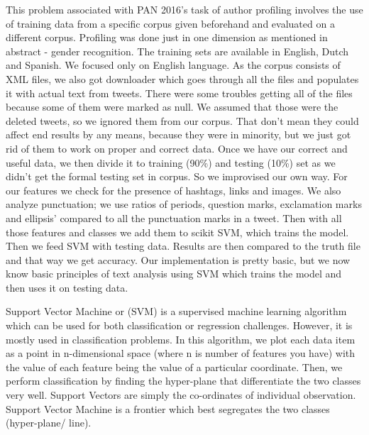 \documentclass{llncs}
\begin{document}
This problem associated with PAN 2016's task of author profiling involves the use of training data from a specific corpus given beforehand and evaluated on a different corpus. Profiling was done just in one dimension as mentioned in abstract - gender recognition. The training sets are available in English, Dutch and Spanish. We focused only on English language. As the corpus consists of XML files, we also got downloader which goes through all the files and populates it with actual text from tweets. There were some troubles getting all of the files because some of them were marked as null. We assumed that those were the deleted tweets, so we ignored them from our corpus. That don't mean they could affect end results by any means, because they were in minority, but we just got rid of them to work on proper and correct data.
Once we have our correct and useful data, we then divide it to training (90\%) and testing (10\%) set as we didn't get the formal testing set in corpus. So we improvised our own way.
For our features we check for the presence of hashtags, links and images. We also analyze punctuation; we use ratios of periods, question marks, exclamation marks and ellipsis’ compared to all the punctuation marks in a tweet. Then with all those features and classes we add them to scikit SVM, which trains the model. Then we feed SVM with testing data. Results are then compared to the truth file and that way we get accuracy. Our implementation is pretty basic, but we now know basic principles of text analysis using SVM which trains the model and then uses it on testing data.

\newpage

\noindent Support Vector Machine or (SVM) is a supervised machine learning algorithm which can be used for both classification or regression challenges. However,  it is mostly used in classification problems. In this algorithm, we plot each data item as a point in n-dimensional space (where n is number of features you have) with the value of each feature being the value of a particular coordinate. Then, we perform classification by finding the hyper-plane that differentiate the two classes very well. Support Vectors are simply the co-ordinates of individual observation. Support Vector Machine is a frontier which best segregates the two classes (hyper-plane/ line).

\bigskip
\bigskip
\end{document}
